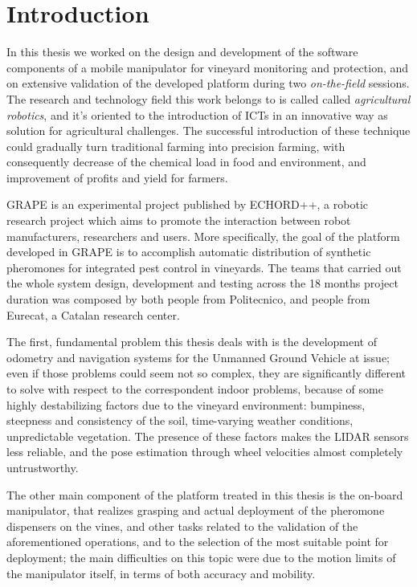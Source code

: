 
\chapter{Introduction} \label{chap:introduction}

In this thesis we worked on the design and development of the software components of a mobile manipulator for vineyard monitoring and protection, and on extensive validation of the developed platform during two \textit{on-the-field} sessions. The research and technology field this work belongs to is called called  \textit{agricultural robotics}, and it's oriented to the introduction of ICTs in an innovative way as solution for agricultural challenges. The successful introduction of these technique could gradually turn traditional farming into precision farming, with consequently decrease of the chemical load in food and environment, and improvement of profits and yield for farmers.

\par \ac{GRAPE} is an experimental project published by \ac{ECHORD++}, a robotic research project which aims to promote the interaction between robot manufacturers, researchers and users. More specifically, the goal of the platform developed in \ac{GRAPE} is to accomplish automatic distribution of synthetic pheromones for integrated pest control in vineyards.
The teams that carried out the whole system design, development and testing across the 18 months project duration was composed by both people from Politecnico, and people from Eurecat, a Catalan research center. 

The first, fundamental problem this thesis deals with is the development of odometry and navigation systems for the Unmanned Ground Vehicle at issue; even if those problems could seem not so complex, they are significantly different to solve with respect to the correspondent indoor problems, because of some highly destabilizing factors due to the vineyard environment: bumpiness, steepness and consistency of the soil, time-varying weather conditions, unpredictable vegetation. The presence of these factors makes the \ac{LIDAR} sensors less reliable, and the pose estimation through wheel velocities almost completely untrustworthy.

The other main component of the platform treated in this thesis is the on-board manipulator, that realizes grasping and actual deployment of the pheromone dispensers on the vines, and other tasks related to the validation of the aforementioned operations, and to the selection of the most suitable point for deployment; the main difficulties on this topic were due to the motion limits of the manipulator itself, in terms of both accuracy and mobility.

